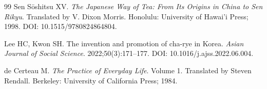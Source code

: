 \documentclass[numbers]{IntechOpen-Book}
\begin{document}
\begin{backmatter}
\begin{thebibliography}{99}
Sen Sōshitsu XV. \textit{The Japanese Way of Tea: From Its Origins in China to Sen Rikyu}. Translated by V. Dixon Morris. Honolulu: University of Hawai'i Press; 1998. DOI: 10.1515/9780824864804.

Lee HC, Kwon SH. The invention and promotion of cha-rye in Korea. \textit{Asian Journal of Social Science}. 2022;50(3):171--177. DOI: 10.1016/j.ajss.2022.06.004.

de Certeau M. \textit{The Practice of Everyday Life}. Volume 1. Translated by Steven Rendall. Berkeley: University of California Press; 1984.

\end{thebibliography}

\end{backmatter}
\end{document}
